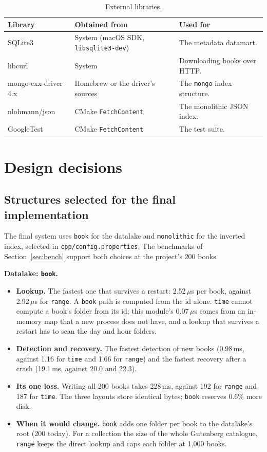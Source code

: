 \documentclass[11pt,a4paper]{article}
\newcommand{\code}[1]{\texttt{#1}}
\newcommand{\us}{\,$\mu$s}
\begin{document}
\begin{table}[H]
\centering\small
\begin{tabularx}{\linewidth}{@{}L{3.4cm} L{4.0cm} Y@{}}
\toprule
Library & Obtained from & Used for \\
\midrule
SQLite3 & System (macOS SDK, \code{libsqlite3-dev}) & The metadata datamart. \\
libcurl & System & Downloading books over HTTP. \\
mongo-cxx-driver 4.x & Homebrew or the driver's sources & The \code{mongo} index structure. \\
nlohmann/json & CMake \code{FetchContent} & The monolithic JSON index. \\
GoogleTest & CMake \code{FetchContent} & The test suite. \\
\bottomrule
\end{tabularx}
\caption{External libraries.}
\end{table}

\section{Design decisions}\label{sec:decisions}

\subsection{Structures selected for the final implementation}
The final system uses \code{book} for the datalake and \code{monolithic} for the inverted index,
selected in \code{cpp/config.properties}. The benchmarks of Section~\ref{sec:bench} support both
choices at the project's 200 books.

\textbf{Datalake: \code{book}.}
\begin{itemize}
  \item \textbf{Lookup.} The fastest one that survives a restart: 2.52\us{} per book, against 2.92\us{}
        for \code{range}. A \code{book} path is computed from the id alone. \code{time} cannot compute
        a book's folder from its id; this module's 0.07\us{} comes from an in-memory map that a new
        process does not have, and a lookup that survives a restart has to scan the day and hour
        folders.
  \item \textbf{Detection and recovery.} The fastest detection of new books (0.98\,ms, against 1.16
        for \code{time} and 1.66 for \code{range}) and the fastest recovery after a crash (19.1\,ms,
        against 20.0 and 22.3).
  \item \textbf{Its one loss.} Writing all 200 books takes 228\,ms, against 192 for \code{range} and
        187 for \code{time}. The three layouts store identical bytes; \code{book} reserves 0.6\% more
        disk.
  \item \textbf{When it would change.} \code{book} adds one folder per book to the datalake's root
        (200 today). For a collection the size of the whole Gutenberg catalogue, \code{range} keeps
        the direct lookup and caps each folder at 1,000 books.
\end{itemize}
\end{document}
